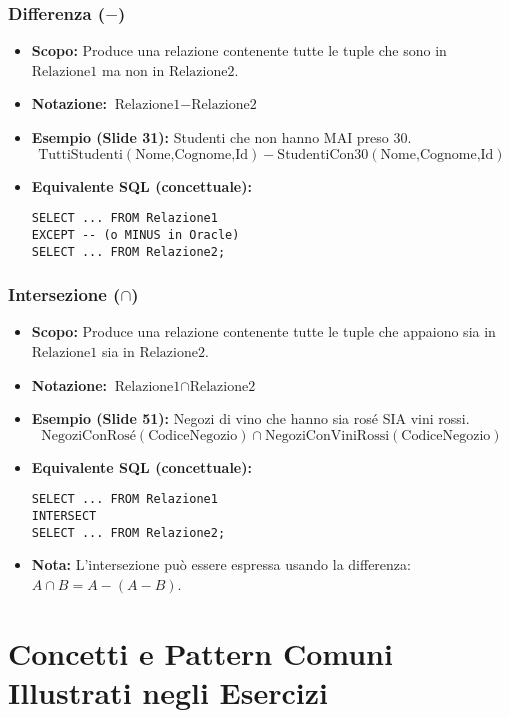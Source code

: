 \subsubsection[Differenza (-)]{Differenza ($-$)}
\begin{itemize}
    \item \textbf{Scopo:} Produce una relazione contenente tutte le tuple che sono in $\text{Relazione1}$ ma non in $\text{Relazione2}$.
    \item \textbf{Notazione:} $\text{Relazione1} - \text{Relazione2}$
    \item \textbf{Esempio (Slide 31):} Studenti che non hanno MAI preso 30.
          \[ \text{TuttiStudenti}(\text{Nome,Cognome,Id}) - \text{StudentiCon30}(\text{Nome,Cognome,Id}) \]
    \item \textbf{Equivalente SQL (concettuale):}
\begin{verbatim}
SELECT ... FROM Relazione1
EXCEPT -- (o MINUS in Oracle)
SELECT ... FROM Relazione2;
\end{verbatim}
\end{itemize}

\subsubsection[Intersezione (intersezione)]{Intersezione ($\cap$)}
\begin{itemize}
    \item \textbf{Scopo:} Produce una relazione contenente tutte le tuple che appaiono sia in $\text{Relazione1}$ sia in $\text{Relazione2}$.
    \item \textbf{Notazione:} $\text{Relazione1} \cap \text{Relazione2}$
    \item \textbf{Esempio (Slide 51):} Negozi di vino che hanno sia rosé SIA vini rossi.
          \[ \text{NegoziConRosé}(\text{CodiceNegozio}) \cap \text{NegoziConViniRossi}(\text{CodiceNegozio}) \]
    \item \textbf{Equivalente SQL (concettuale):}
\begin{verbatim}
SELECT ... FROM Relazione1
INTERSECT
SELECT ... FROM Relazione2;
\end{verbatim}
    \item \textbf{Nota:} L'intersezione può essere espressa usando la differenza: $A \cap B = A - (A - B)$.
\end{itemize}\section{Concetti e Pattern Comuni Illustrati negli Esercizi}

